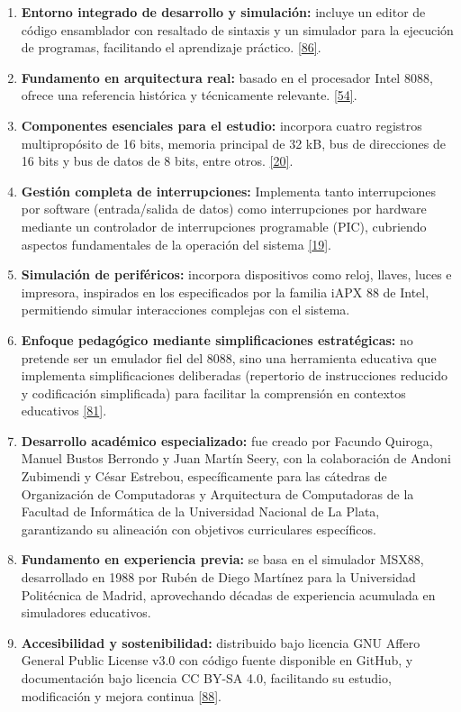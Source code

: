 \documentclass[12pt,oneside]{templates/unerthesis}
\begin{document}
\begin{enumerate}
\def\labelenumi{\arabic{enumi}.}
\item
  \textbf{Entorno integrado de desarrollo y simulación:} incluye un editor de código ensamblador con resaltado de sintaxis y un simulador para la ejecución de programas, facilitando el aprendizaje práctico. \protect\hyperlink{ref-vonsim}{{[}86{]}}.
\item
  \textbf{Fundamento en arquitectura real:} basado en el procesador Intel 8088, ofrece una referencia histórica y técnicamente relevante. \protect\hyperlink{ref-intel8086manual}{{[}54{]}}.
\item
  \textbf{Componentes esenciales para el estudio:} incorpora cuatro registros multipropósito de 16 bits, memoria principal de 32 kB, bus de direcciones de 16 bits y bus de datos de 8 bits, entre otros. \protect\hyperlink{ref-stallings_computer_2021}{{[}20{]}}.
\item
  \textbf{Gestión completa de interrupciones:} Implementa tanto interrupciones por software (entrada/salida de datos) como interrupciones por hardware mediante un controlador de interrupciones programable (PIC), cubriendo aspectos fundamentales de la operación del sistema \protect\hyperlink{ref-hennessy2017computer}{{[}19{]}}.
\item
  \textbf{Simulación de periféricos:} incorpora dispositivos como reloj, llaves, luces e impresora, inspirados en los especificados por la familia iAPX 88 de Intel, permitiendo simular interacciones complejas con el sistema.
\item
  \textbf{Enfoque pedagógico mediante simplificaciones estratégicas:} no pretende ser un emulador fiel del 8088, sino una herramienta educativa que implementa simplificaciones deliberadas (repertorio de instrucciones reducido y codificación simplificada) para facilitar la comprensión en contextos educativos \protect\hyperlink{ref-patt2019introduction}{{[}81{]}}.
\item
  \textbf{Desarrollo académico especializado:} fue creado por Facundo Quiroga, Manuel Bustos Berrondo y Juan Martín Seery, con la colaboración de Andoni Zubimendi y César Estrebou, específicamente para las cátedras de Organización de Computadoras y Arquitectura de Computadoras de la Facultad de Informática de la Universidad Nacional de La Plata, garantizando su alineación con objetivos curriculares específicos.
\item
  \textbf{Fundamento en experiencia previa:} se basa en el simulador MSX88, desarrollado en 1988 por Rubén de Diego Martínez para la Universidad Politécnica de Madrid, aprovechando décadas de experiencia acumulada en simuladores educativos.
\item
  \textbf{Accesibilidad y sostenibilidad:} distribuido bajo licencia GNU Affero General Public License v3.0 con código fuente disponible en GitHub, y documentación bajo licencia CC BY-SA 4.0, facilitando su estudio, modificación y mejora continua \protect\hyperlink{ref-opensource_licensing_2024}{{[}88{]}}.
\end{enumerate}
\end{document}
